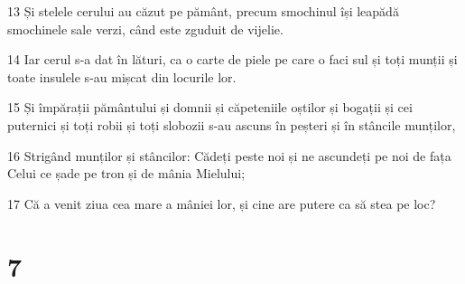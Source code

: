 \par 13 Și stelele cerului au căzut pe pământ, precum smochinul își leapădă smochinele sale verzi, când este zguduit de vijelie.
\par 14 Iar cerul s-a dat în lături, ca o carte de piele pe care o faci sul și toți munții și toate insulele s-au mișcat din locurile lor.
\par 15 Și împărații pământului și domnii și căpeteniile oștilor și bogații și cei puternici și toți robii și toți slobozii s-au ascuns în peșteri și în stâncile munților,
\par 16 Strigând munților și stâncilor: Cădeți peste noi și ne ascundeți pe noi de fața Celui ce șade pe tron și de mânia Mielului;
\par 17 Că a venit ziua cea mare a mâniei lor, și cine are putere ca să stea pe loc?

\chapter{7}

